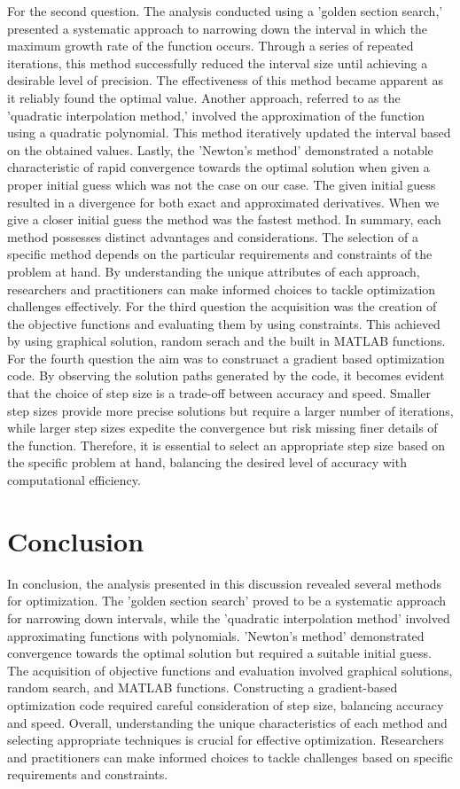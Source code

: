 \documentclass[12pt, a4paper]{article}
\numberwithin{equation}{section}
\begin{document}
For the second question. The analysis conducted using a 'golden section search,' presented a systematic approach to narrowing down the interval in which the maximum growth rate of the function occurs. Through a series of repeated iterations, this method successfully reduced the interval size until achieving a desirable level of precision. The effectiveness of this method became apparent as it reliably found the optimal value. Another approach, referred to as the 'quadratic interpolation method,' involved the approximation of the function using a quadratic polynomial. This method iteratively updated the interval based on the obtained values. Lastly, the 'Newton's method' demonstrated a notable characteristic of rapid convergence towards the optimal solution when given a proper initial guess which was not the case on our case. The given initial guess resulted in a divergence for both exact and approximated derivatives. When we give a closer initial guess the method was the fastest method. In summary, each method possesses distinct advantages and considerations. The selection of a specific method depends on the particular requirements and constraints of the problem at hand. By understanding the unique attributes of each approach, researchers and practitioners can make informed choices to tackle optimization challenges effectively. For the third question the acquisition was the creation of the objective functions and evaluating them by using constraints. This achieved by using graphical solution, random serach and the built in MATLAB functions. For the fourth question the aim was to construact a gradient based optimization code. By observing the solution paths generated by the code, it becomes evident that the choice of step size is a trade-off between accuracy and speed. Smaller step sizes provide more precise solutions but require a larger number of iterations, while larger step sizes expedite the convergence but risk missing finer details of the function. Therefore, it is essential to select an appropriate step size based on the specific problem at hand, balancing the desired level of accuracy with computational efficiency.

\section{Conclusion}


In conclusion, the analysis presented in this discussion revealed several methods for optimization. The 'golden section search' proved to be a systematic approach for narrowing down intervals, while the 'quadratic interpolation method' involved approximating functions with polynomials. 'Newton's method' demonstrated convergence towards the optimal solution but required a suitable initial guess. The acquisition of objective functions and evaluation involved graphical solutions, random search, and MATLAB functions. Constructing a gradient-based optimization code required careful consideration of step size, balancing accuracy and speed. Overall, understanding the unique characteristics of each method and selecting appropriate techniques is crucial for effective optimization. Researchers and practitioners can make informed choices to tackle challenges based on specific requirements and constraints.
\end{document}
